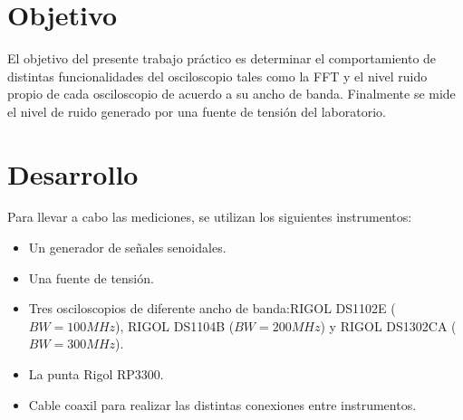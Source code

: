 \documentclass[a4paper,10pt]{article}
\title{  }
\begin{document}
	\maketitle %
	\newpage

	\tableofcontents %
	\newpage
	

	\section{Objetivo}
	
	\indent	El objetivo del presente trabajo práctico es determinar el 
	comportamiento de distintas funcionalidades del osciloscopio 
	tales como la FFT y el nivel ruido propio de cada osciloscopio de acuerdo a
	su ancho de banda. Finalmente se mide el nivel de ruido generado por una 
	fuente de tensi\'on del laboratorio. 

	\newpage
	\section{Desarrollo}
	
\indent Para llevar a cabo las mediciones, se utilizan los siguientes
		instrumentos:
		\begin{itemize}
			\item Un generador de señales senoidales.
			\item Una fuente de tensi\'on.
			\item Tres osciloscopios de diferente ancho de banda:RIGOL DS1102E (
			$BW=100MHz$), RIGOL DS1104B ($BW=200MHz$) y RIGOL DS1302CA (
			$BW=300MHz$).
			\item La punta Rigol RP3300.
			\item Cable coaxil para realizar las distintas conexiones entre 
			instrumentos.
		\end{itemize}
		
\end{document}
